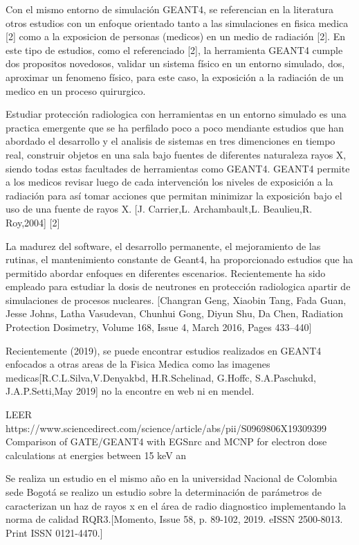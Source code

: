 \documentclass[a4paper,10pt]{article}
\begin{document}
Con el mismo entorno de simulación GEANT4, se referencian en la literatura otros estudios con un enfoque orientado tanto a las simulaciones en fisica medica [2] como a la exposicion de personas (medicos) en un medio de radiación [2]. En este tipo de estudios, como el referenciado [2], la herramienta GEANT4 cumple dos propositos novedosos, validar un sistema físico en un entorno simulado, dos, aproximar un fenomeno físico, para este caso, la exposición a la radiación de un medico en un proceso quirurgico. 


Estudiar protección radiologica con herramientas en un entorno simulado es una practica emergente que se ha perfilado poco a poco mendiante estudios que han abordado el desarrollo y el analisis de sistemas en tres dimenciones en tiempo real, construir objetos en una sala bajo fuentes de diferentes naturaleza rayos X, siendo todas estas facultades de herramientas como GEANT4. GEANT4 permite  a los medicos revisar luego de cada intervención los niveles de exposición a la radiación para así tomar acciones que permitan minimizar la exposición bajo el uso de una fuente de rayos X. [J. Carrier,L. Archambault,L. Beaulieu,R. Roy,2004] [2]


 
La madurez del software, el desarrollo permanente, el mejoramiento de las rutinas, el mantenimiento constante de Geant4, ha proporcionado estudios que ha permitido abordar enfoques en diferentes escenarios. Recientemente ha sido empleado para estudiar la dosis de neutrones en protección radiologica apartir de simulaciones de procesos nucleares. [Changran Geng, Xiaobin Tang, Fada Guan, Jesse Johns, Latha Vasudevan, Chunhui Gong, Diyun Shu, Da Chen, Radiation Protection Dosimetry, Volume 168, Issue 4, March 2016, Pages 433–440]

Recientemente (2019), se puede encontrar estudios realizados en GEANT4 enfocados a otras areas de la Fisica Medica como las imagenes medicas[R.C.L.Silva,V.Denyakbd, H.R.Schelinad, G.Hoffc, S.A.Paschukd, J.A.P.Setti,May 2019] no la encontre en web ni en mendel.

%
LEER
https://www.sciencedirect.com/science/article/abs/pii/S0969806X19309399
%
Comparison of GATE/GEANT4 with EGSnrc and MCNP for electron dose calculations at energies between 15 keV an



Se realiza un estudio en el mismo año en la universidad Nacional de Colombia sede Bogotá se realizo un estudio sobre la  determinación de parámetros de caracterizan un haz de rayos x en el área de radio diagnostico implementando la norma de calidad RQR3.[Momento, Issue 58, p. 89-102, 2019. eISSN 2500-8013. Print ISSN 0121-4470.]
\end{document}
